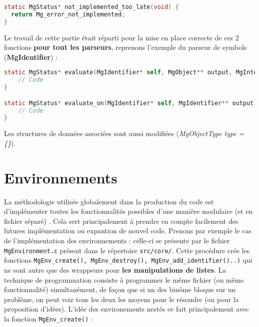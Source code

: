 \documentclass[11pt]{article}
\begin{document}
\begin{lstlisting}[language=C]
static MgStatus* not_implemented_too_late(void) {
  return Mg_error_not_implemented;
}
\end{lstlisting}
Le travail de cette partie \'etait r\'eparti pour la mise en place correcte de ces 2 fonctions \textbf{pour tout les parseurs}, reprenons l'exemple du parseur de symbols (\textbf{MgIdentifier}) :

\begin{lstlisting}[language=C]
static MgStatus* evaluate(MgIdentifier* self, MgObject** output, MgInterpreter* interpreter, MgEnv* env){
	// Code
}

static MgStatus* evaluate_on(MgIdentifier* self, MgIdentifier** output){
	// Code 
}
\end{lstlisting}

\noindent Les structures de donn\'ees associ\'ees sont aussi modifi\'ees (\textit{MgObjectType type = \{\}}).
\newline\newline 
\section{Environnements}
La m\'ethodologie utilis\'ee globalement dans la production du code est d'impl\'ementer toutes les fonctionnalit\'es possibles d'une mani\`ere modulaire (et en fichier s\'epar\'e) . Cela sert principalement \`a prendre en compte facilement des futures impl\'ementation ou expantion de nouvel code.\newline
Prenons par exemple le cas de l'impl\'ementation des environnements : celle-ci se pr\'esente par le fichier \texttt{MgEnvironment.c} pr\'esent dans le r\'epertoire \texttt{src/core/}. Cette proc\'edure cr\'ee les fonctions \texttt{MgEnv\_create(), MgEnv\_destroy(), MgEnv\_add\_identifier()..)} qui ne sont autre que des wrappeurs pour \textbf{les manipulations de listes}.\newline\newline
La technique de programmation consiste \`a programmer le m\^eme fichier (ou m\^eme fonctionnalit\'e) simultan\'ement, de fa\c con que si un des bin\^ome bloque sur un probl\`eme, on peut voir tous les deux les moyens pour le r\'esoudre (ou pour la proposition d'id\'ees).\newline
L'id\'ee des environements nest\'es ce fait principalement avec la fonction \texttt{MgEnv\_create()} :
\end{document}
